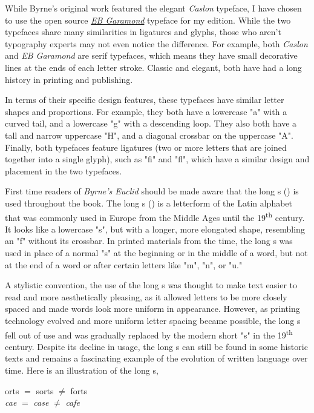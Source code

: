 \documentclass[twoside,11pt]{report}
\begin{document}
While Byrne's original work featured the elegant \textit{Caslon} typeface, I have chosen to use the open source \href{https://github.com/georgd/EB-Garamond}{\textit{EB Garamond}} typeface for my edition. While the two typefaces share many similarities in ligatures and glyphs, those who aren't typography experts may not even notice the difference.  For example, both \textit{Caslon} and \textit{EB Garamond} are serif typefaces, which means they have small decorative lines at the ends of each letter stroke. Classic and elegant, both have had a long history in printing and publishing.

In terms of their specific design features, these typefaces have similar letter shapes and proportions. For example, they both have a lowercase "a" with a curved tail, and a lowercase "g" with a descending loop. They also both have a tall and narrow uppercase "H", and a diagonal crossbar on the uppercase "A".  Finally, both typefaces feature ligatures (two or more letters that are joined together into a single glyph), such as "fi" and "fl", which have a similar design and placement in the two typefaces.

First time readers of \textit{Byrne's Euclid} should be made aware that the long s ({\color{cred}{ſ}}) is used throughout the book. The long s ({\color{cred}{ſ}}) is a letterform of the Latin alphabet that was commonly used in Europe from the Middle Ages until the 19\textsuperscript{th} century. It looks like a lowercase "s", but with a longer, more elongated shape, resembling an "f" without its crossbar. In printed materials from the time, the long s was used in place of a normal "s" at the beginning or in the middle of a word, but not at the end of a word or after certain letters like "m", "n", or "u."

A stylistic convention, the use of the long s was thought to make text easier to read and more aesthetically pleasing, as it allowed letters to be more closely spaced and made words look more uniform in appearance. However, as printing technology evolved and more uniform letter spacing became possible, the long s fell out of use and was gradually replaced by the modern short "s" in the 19\textsuperscript{th} century. Despite its decline in usage, the long s can still be found in some historic texts and remains a fascinating example of the evolution of written language over time.  Here is an illustration of the long s,
\begin{center}
  {\color{cred}{ſ}}orts $=$ sorts $\neq$ forts\\
  \textit{ca{\color{cred}{ſ}}e} $=$ \textit{case} $\neq$ \textit{cafe}
\end{center}
\end{document}
